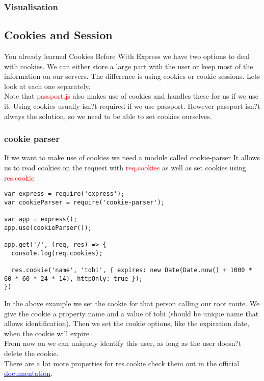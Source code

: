 \documentclass[a4paper]{article}
\begin{document}
\subsubsection{Visualisation}
\subsection{Cookies and Session}
You already learned Cookies Before With Express we have two options to deal with cookies. We can either store a large part with the user or keep most of the information on our servers. The difference is using cookies or cookie sessions. Lets look at each one separately.\\

Note that \textcolor{red}{passport.js} also makes use of cookies and handles these for us if we use it. Using cookies usually isn?t required if we use passport. However passport isn?t always the solution, so we need to be able to set cookies ourselves.

\subsubsection{cookie parser}
If we want to make use of cookies we need a module called cookie-parser It allows us to read cookies on the request with \textcolor{red}{req.cookies} as well as set cookies using \textcolor{red}{res.cookie}

\begin{lstlisting}
var express = require('express');
var cookieParser = require('cookie-parser');

var app = express();
app.use(cookieParser());

app.get('/', (req, res) => {
  console.log(req.cookies);

  res.cookie('name', 'tobi', { expires: new Date(Date.now() + 1000 * 60 * 60 * 24 * 14), httpOnly: true });
})
\end{lstlisting}
In the above example we set the cookie for that person calling our root route. We give the cookie a property name and a value of tobi (should be unique name that allows identification). Then we set the cookie options, like the expiration date, when the cookie will expire.
\\
From now on we can uniquely identify this user, as long as the user doesn?t delete the cookie.
\\
There are a lot more properties for res.cookie check them out in the official \href{https://expressjs.com/en/4x/api.html#res.cookie}{\textcolor{blue}{documentation}}.
\end{document}

